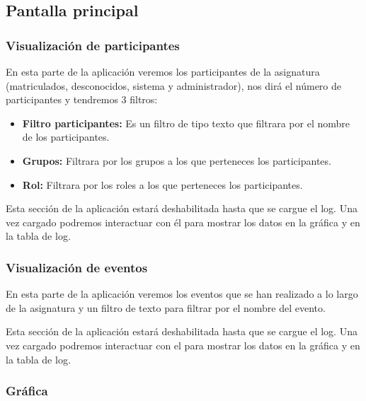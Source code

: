\subsection{Pantalla principal}


\subsubsection{Visualización de participantes}

En esta parte de la aplicación veremos los participantes de la asignatura (matriculados, desconocidos, sistema y administrador), nos dirá el número de participantes y tendremos 3 filtros:


\begin{itemize}
	\tightlist
	\item
	\textbf{Filtro participantes:} Es un filtro de tipo texto que filtrara por el nombre de los participantes.
	\item
	\textbf{Grupos:} Filtrara por los grupos a los que perteneces los participantes.
	\item
	\textbf{Rol:} Filtrara por los roles a los que perteneces los participantes.
	
\end{itemize}



Esta sección de la aplicación estará deshabilitada hasta que se cargue el log. Una vez cargado podremos interactuar con él para mostrar los datos en la gráfica y en la tabla de log.

\subsubsection{Visualización de eventos}

En esta parte de la aplicación veremos los eventos que se han realizado a lo largo de la asignatura y un filtro de texto para filtrar por el nombre del evento.



Esta sección de la aplicación estará deshabilitada hasta que se cargue el log. Una vez cargado podremos interactuar con el para mostrar los datos en la gráfica y en la tabla de log.

\subsubsection{Gráfica}

